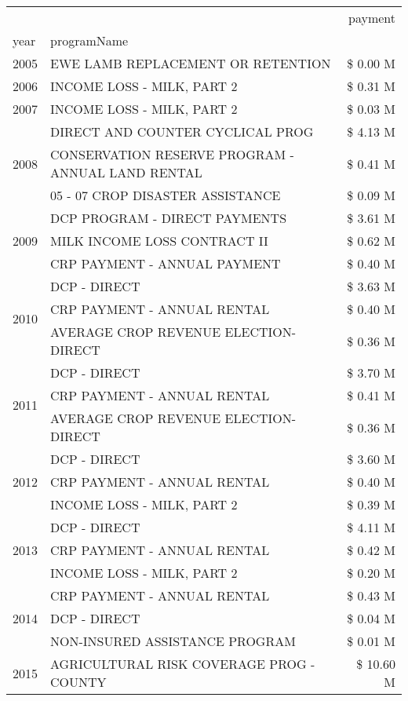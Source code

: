 \begin{tabular}{llr}
\toprule
 &  & payment \\
year & programName &  \\
\midrule
2005 & EWE LAMB REPLACEMENT OR RETENTION & \$ 0.00 M \\
\cline{1-3}
2006 & INCOME LOSS - MILK, PART 2 & \$ 0.31 M \\
\cline{1-3}
2007 & INCOME LOSS - MILK, PART 2 & \$ 0.03 M \\
\cline{1-3}
\multirow[t]{3}{*}{2008} & DIRECT AND COUNTER CYCLICAL PROG & \$ 4.13 M \\
 & CONSERVATION RESERVE PROGRAM - ANNUAL LAND RENTAL & \$ 0.41 M \\
 & 05 - 07 CROP DISASTER ASSISTANCE & \$ 0.09 M \\
\cline{1-3}
\multirow[t]{3}{*}{2009} & DCP PROGRAM - DIRECT PAYMENTS & \$ 3.61 M \\
 & MILK INCOME LOSS CONTRACT II & \$ 0.62 M \\
 & CRP PAYMENT - ANNUAL PAYMENT & \$ 0.40 M \\
\cline{1-3}
\multirow[t]{3}{*}{2010} & DCP - DIRECT & \$ 3.63 M \\
 & CRP PAYMENT - ANNUAL RENTAL & \$ 0.40 M \\
 & AVERAGE CROP REVENUE ELECTION-DIRECT & \$ 0.36 M \\
\cline{1-3}
\multirow[t]{3}{*}{2011} & DCP - DIRECT & \$ 3.70 M \\
 & CRP PAYMENT - ANNUAL RENTAL & \$ 0.41 M \\
 & AVERAGE CROP REVENUE ELECTION-DIRECT & \$ 0.36 M \\
\cline{1-3}
\multirow[t]{3}{*}{2012} & DCP - DIRECT & \$ 3.60 M \\
 & CRP PAYMENT - ANNUAL RENTAL & \$ 0.40 M \\
 & INCOME LOSS - MILK, PART 2 & \$ 0.39 M \\
\cline{1-3}
\multirow[t]{3}{*}{2013} & DCP - DIRECT & \$ 4.11 M \\
 & CRP PAYMENT - ANNUAL RENTAL & \$ 0.42 M \\
 & INCOME LOSS - MILK, PART 2 & \$ 0.20 M \\
\cline{1-3}
\multirow[t]{3}{*}{2014} & CRP PAYMENT - ANNUAL RENTAL & \$ 0.43 M \\
 & DCP - DIRECT & \$ 0.04 M \\
 & NON-INSURED ASSISTANCE PROGRAM & \$ 0.01 M \\
\cline{1-3}
\multirow[t]{3}{*}{2015} & AGRICULTURAL RISK COVERAGE PROG - COUNTY & \$ 10.60 M \\

\end{tabular}

